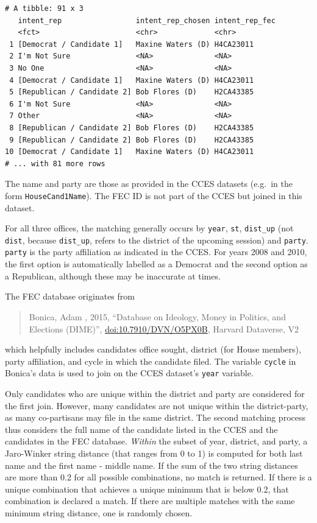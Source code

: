 \documentclass[10pt,article,oneside]{memoir}
\theoremstyle{definition}
\begin{document}
\begin{verbatim}
# A tibble: 91 x 3
   intent_rep                 intent_rep_chosen intent_rep_fec
   <fct>                      <chr>             <chr>         
 1 [Democrat / Candidate 1]   Maxine Waters (D) H4CA23011     
 2 I'm Not Sure               <NA>              <NA>          
 3 No One                     <NA>              <NA>          
 4 [Democrat / Candidate 1]   Maxine Waters (D) H4CA23011     
 5 [Republican / Candidate 2] Bob Flores (D)    H2CA43385     
 6 I'm Not Sure               <NA>              <NA>          
 7 Other                      <NA>              <NA>          
 8 [Republican / Candidate 2] Bob Flores (D)    H2CA43385     
 9 [Republican / Candidate 2] Bob Flores (D)    H2CA43385     
10 [Democrat / Candidate 1]   Maxine Waters (D) H4CA23011     
# ... with 81 more rows
\end{verbatim}

The name and party are those as provided in the CCES datasets (e.g.~in
the form \texttt{HouseCand1Name}). The FEC ID is not part of the CCES
but joined in this dataset.

For all three offices, the matching generally occurs by \texttt{year},
\texttt{st}, \texttt{dist\_up} (not \texttt{dist}, because
\texttt{dist\_up}, refers to the district of the upcoming session) and
\texttt{party}. \texttt{party} is the party affiliation as indicated in
the CCES. For years 2008 and 2010, the first option is automatically
labelled as a Democrat and the second option as a Republican, although
these may be inaccurate at times.

The FEC database originates from

\begin{quote}
Bonica, Adam , 2015, ``Database on Ideology, Money in Politics, and
Elections (DIME)'', \url{doi:10.7910/DVN/O5PX0B}, Harvard Dataverse, V2
\end{quote}

which helpfully includes candidates office sought, district (for House
members), party affiliation, and cycle in which the candidate filed. The
variable \texttt{cycle} in Bonica's data is used to join on the CCES
dataset's \texttt{year} variable.

Only candidates who are unique within the district and party are
considered for the first join. However, many candidates are not unique
within the district-party, as many co-partisans may file in the same
district. The second matching process thus considers the full name of
the candidate listed in the CCES and the candidates in the FEC database.
\emph{Within} the subset of year, district, and party, a Jaro-Winker
string distance (that ranges from 0 to 1) is computed for both last name
and the first name - middle name. If the sum of the two string distances
are more than 0.2 for all possible combinations, no match is returned.
If there is a unique combination that achieves a unique minimum that is
below 0.2, that combination is declared a match. If there are multiple
matches with the same minimum string distance, one is randomly chosen.
\end{document}
